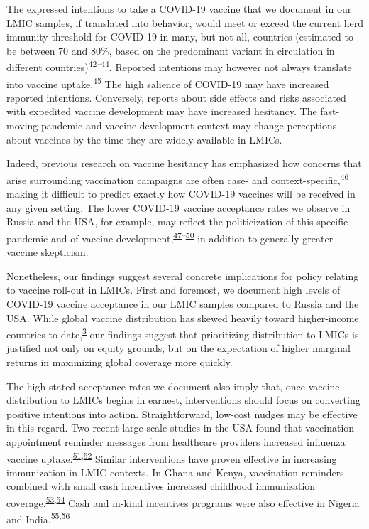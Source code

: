 \documentclass[
  12pt,
]{article}
\begin{document}
The expressed intentions to take a COVID-19 vaccine that we document in our LMIC samples, if translated into behavior, would meet or exceed the current herd immunity threshold for COVID-19 in many, but not all, countries (estimated to be between 70 and 80\%, based on the predominant variant in circulation in different countries)\textsuperscript{\protect\hyperlink{ref-ontario}{42}--\protect\hyperlink{ref-mcneil_2021}{44}}. Reported intentions may however not always translate into vaccine uptake.\textsuperscript{\protect\hyperlink{ref-mceachanetal2011}{45}} The high salience of COVID-19 may have increased reported intentions. Conversely, reports about side effects and risks associated with expedited vaccine development may have increased hesitancy. The fast-moving pandemic and vaccine development context may change perceptions about vaccines by the time they are widely available in LMICs.

Indeed, previous research on vaccine hesitancy has emphasized how concerns that arise surrounding vaccination campaigns are often case- and context-specific,\textsuperscript{\protect\hyperlink{ref-larson2011addressing}{46}} making it difficult to predict exactly how COVID-19 vaccines will be received in any given setting. The lower COVID-19 vaccine acceptance rates we observe in Russia and the USA, for example, may reflect the politicization of this specific pandemic and of vaccine development,\textsuperscript{\protect\hyperlink{ref-hornsey2020donald}{47}--\protect\hyperlink{ref-burki2020russian}{50}} in addition to generally greater vaccine skepticism.

Nonetheless, our findings suggest several concrete implications for policy relating to vaccine roll-out in LMICs. First and foremost, we document high levels of COVID-19 vaccine acceptance in our LMIC samples compared to Russia and the USA. While global vaccine distribution has skewed heavily toward higher-income countries to date,\textsuperscript{\protect\hyperlink{ref-wouters2021challenges}{3}} our findings suggest that prioritizing distribution to LMICs is justified not only on equity grounds, but on the expectation of higher marginal returns in maximizing global coverage more quickly.

The high stated acceptance rates we document also imply that, once vaccine distribution to LMICs begins in earnest, interventions should focus on converting positive intentions into action. Straightforward, low-cost nudges may be effective in this regard. Two recent large-scale studies in the USA found that vaccination appointment reminder messages from healthcare providers increased influenza vaccine uptake.\textsuperscript{\protect\hyperlink{ref-milkmanetal2021a}{51},\protect\hyperlink{ref-milkmanetal2021b}{52}} Similar interventions have proven effective in increasing immunization in LMIC contexts. In Ghana and Kenya, vaccination reminders combined with small cash incentives increased childhood immunization coverage.\textsuperscript{\protect\hyperlink{ref-levine2021}{53},\protect\hyperlink{ref-gibsonetal2017}{54}} Cash and in-kind incentives programs were also effective in Nigeria and India.\textsuperscript{\protect\hyperlink{ref-idinsight}{55},\protect\hyperlink{ref-Banerjee2010}{56}}
\end{document}
